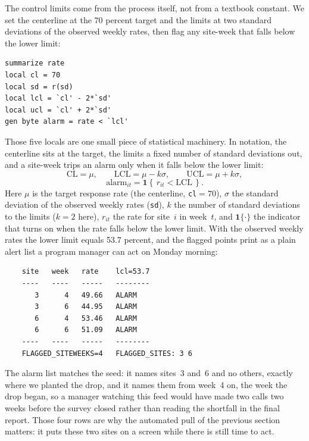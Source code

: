 \documentclass[
    a4paper,
    fontsize=10pt,
    twoside=true,
    numbers=noenddot,
]{kaobook}
\begin{document}
The control limits come from the process itself, not from a textbook constant. We set the centerline at the 70 percent target and the limits at two standard deviations of the observed weekly rates, then flag any site-week that falls below the lower limit:
\par
{\footnotesize
\begin{verbatim}
summarize rate
local cl = 70
local sd = r(sd)
local lcl = `cl' - 2*`sd'
local ucl = `cl' + 2*`sd'
gen byte alarm = rate < `lcl'
\end{verbatim}
}
Those five locals are one small piece of statistical machinery. In notation, the centerline sits at the target, the limits a fixed number of standard deviations out, and a site-week trips an alarm only when it falls below the lower limit:
\[
  \text{CL}=\mu,\qquad
  \text{LCL}=\mu-k\sigma,\qquad
  \text{UCL}=\mu+k\sigma,
\]
\[
  \text{alarm}_{it}=\mathbf{1}\!\left\{\,r_{it}<\text{LCL}\,\right\}.
\]
Here $\mu$ is the target response rate (the centerline, \texttt{cl}$=70$), $\sigma$ the standard deviation of the observed weekly rates (\texttt{sd}), $k$ the number of standard deviations to the limits ($k=2$ here), $r_{it}$ the rate for site~$i$ in week~$t$, and $\mathbf{1}\{\cdot\}$ the indicator that turns on when the rate falls below the lower limit. With the observed weekly rates the lower limit equals 53.7 percent, and the flagged points print as a plain alert list a program manager can act on Monday morning:
\par
{\footnotesize
\begin{verbatim}
    site   week   rate    lcl=53.7
    ----   ----   -----   --------
       3      4   49.66   ALARM
       3      6   44.95   ALARM
       6      4   53.46   ALARM
       6      6   51.09   ALARM
    ----   ----   -----   --------
    FLAGGED_SITEWEEKS=4   FLAGGED_SITES: 3 6
\end{verbatim}
}
The alarm list matches the seed: it names sites~3 and~6 and no others, exactly where we planted the drop, and it names them from week~4 on, the week the drop began, so a manager watching this feed would have made two calls two weeks before the survey closed rather than reading the shortfall in the final report. Those four rows are why the automated pull of the previous section matters: it puts these two sites on a screen while there is still time to act.
\end{document}
